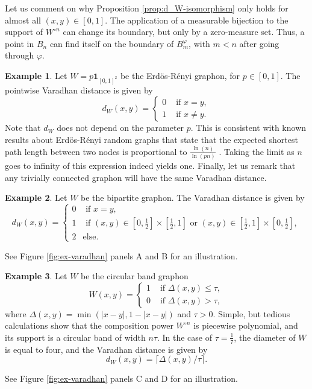 \documentclass[11pt]{article}
\def\II{\bm{1}}
\theoremstyle{definition}
\newtheorem{example}{Example}
\begin{document}
Let us comment on why Proposition \ref{prop:d_W-isomorphism} only holds for almost all $(x,y) \in [0,1]$. The application of a measurable bijection to the support of $W^{\circ n}$ can change its boundary, but only by a zero-measure set. Thus, a point in $B_n$ can find itself on the boundary of $B_m^\varphi$, with $m<n$ after going through $\varphi$.

\begin{example}
Let $W = p\II_{[0,1]^2}$ be the Erd\"os-Rényi graphon, for $p\in[0,1]$. The pointwise Varadhan distance is given by
$$ d_W (x,y) = \begin{cases}
    0 & \text{ if }x=y,\\
    1 & \text{ if } x\neq y.
\end{cases} $$ 
Note that $d_W$ does not depend on the parameter $p$. This is consistent with known results about Erd\"os-Rényi random graphs that state that the expected shortest path length between two nodes is proportional to $\frac{\ln (n)}{\ln (pn)}$ \cite{wattsCollectiveDynamicsSmallworld1998}. Taking the limit as $n$ goes to infinity of this expression indeed yields one. Finally, let us remark that any trivially connected graphon will have the same Varadhan distance.
\end{example}

\begin{example} \label{ex:varadhan-bipartite}
Let $W$ be the bipartite graphon. The Varadhan distance is given by
$$
d_W(x,y) = \begin{cases}
    0 & \text{ if } x=y,\\
    1 & \text{ if }(x,y) \in [0,\frac{1}{2}] \times [\frac{1}{2},1] \text{ or } (x,y) \in [\frac{1}{2},1] \times [0,\frac{1}{2}],\\
    2 & \text{else}.
\end{cases} $$

See Figure \ref{fig:ex-varadhan} panels A and B for an illustration.
\end{example}

\begin{example} \label{ex:varadhan-circular}
Let $W$ be the circular band graphon 
$$ W(x,y) = \begin{cases}
    1 & \text{ if } \Delta(x,y) \le \tau,\\
    0 & \text{ if } \Delta(x,y) > \tau,
\end{cases} $$
where $\Delta(x,y) = \min(|x-y|, 1-|x-y|)$ and $\tau>0$. Simple, but tedious calculations show that the composition power $W^{\circ n}$ is piecewise polynomial, and its support is a circular band of width $n\tau$. In the case of $\tau = \frac{1}{7}$, the diameter of $W$ is equal to four, and the Varadhan distance is given by
$$ d_W (x,y) = \lceil \Delta(x,y) / \tau \rceil. $$

See Figure \ref{fig:ex-varadhan} panels C and D for an illustration.
\end{example}
\end{document}
